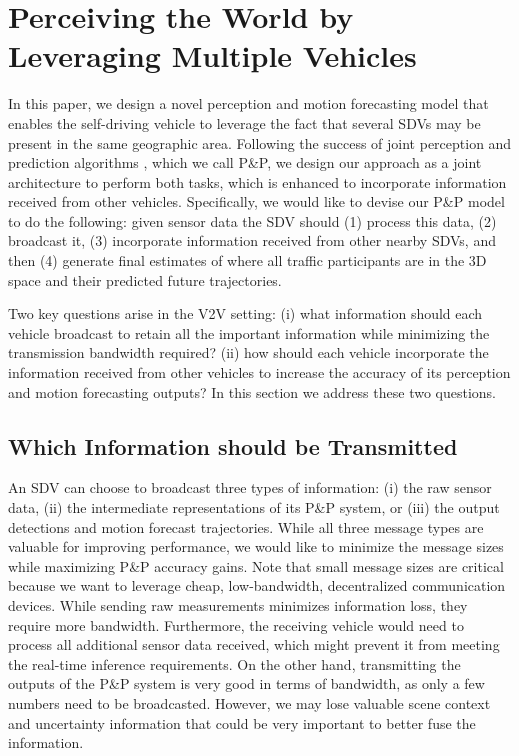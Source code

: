 \documentclass[runningheads]{llncs}
\newcommand{\pnp}{P\&P}
\begin{document}
\section{Perceiving the World by Leveraging Multiple Vehicles}



In this paper, we design a novel perception and motion forecasting  model that enables the self-driving vehicle to leverage the fact that several SDVs may be present in the same geographic area.
Following the success of joint perception and prediction
algorithms \cite{luo2018fast, casas2018intentnet, casas2019spatially, pnpnet}, which we call \pnp, we design our approach as a
joint
architecture to perform both tasks, which is enhanced to
incorporate information received from other vehicles.
Specifically, we would like to devise our \pnp{ } model to do the following: given sensor data
the SDV should (1) process this data, (2) broadcast it, (3) incorporate information received from other nearby SDVs, and then (4) generate final estimates of where all traffic participants are in the 3D space and their predicted future trajectories.

Two key questions arise in the V2V setting:
(i) what information should each vehicle broadcast to retain all the important information while minimizing the transmission bandwidth required?
(ii) how should each vehicle incorporate the information received from other vehicles to increase the accuracy of its perception and motion forecasting outputs?
In this section we address these two questions.

\subsection{Which Information should be Transmitted}
\label{sec:type_of_data}
An SDV can choose to broadcast three types of information:
(i) the raw sensor data, (ii) the intermediate representations of its \pnp{}
system, or (iii) the output detections and motion forecast trajectories.
While all three message types are valuable for improving performance, we would like to minimize the message sizes while maximizing
\pnp{} 
accuracy gains.
Note that small message sizes are critical because we want to leverage cheap, low-bandwidth, decentralized communication devices.
While sending raw measurements minimizes information loss, they require more bandwidth.
Furthermore, the receiving vehicle would need to process all additional 
sensor data received, which might prevent it from meeting the real-time inference requirements.
On the other hand, transmitting the outputs of the
\pnp{}
system is very good in terms of bandwidth, as only a few numbers need to be broadcasted.
However,  we may lose valuable scene context and uncertainty information that could be very important to better  fuse the information.
\end{document}
